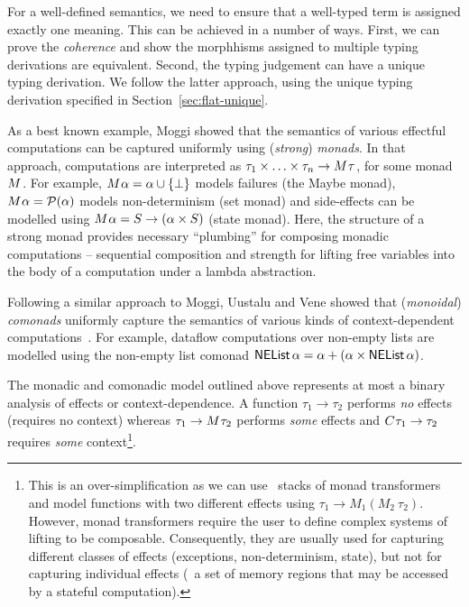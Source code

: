 For a well-defined semantics, we need to ensure that a well-typed term is assigned exactly one
meaning. This can be achieved in a number of ways. First, we can prove the \emph{coherence}
\cite{semantics-bltres} and show the morphhisms assigned to multiple typing derivations are equivalent.
Second, the typing judgement can have a unique typing derivation. We follow the latter approach,
using the unique typing derivation specified in Section~\ref{sec:flat-unique}.

As a best known example, Moggi \cite{monad-notions} showed that the semantics of various effectful
computations can be captured uniformly using (\emph{strong}) \emph{monads}. In that
approach, computations are interpreted as $\tau_1 \times \ldots \times \tau_n \rightarrow M^{}\tau$,
for some monad $M^{}$. For example, $M^{}\alpha = \alpha \cup \{ \bot \}$ models
failures (the Maybe monad), $M^{}\alpha = \mathcal{P}(\alpha)$ models non-determinism (set
monad) and side-effects can be modelled using $M^{}\alpha = S \rightarrow (\alpha \times S)$
(state monad). Here, the structure of a strong monad provides necessary ``plumbing'' for composing
monadic computations -- sequential composition and strength for lifting free variables into the
body of a computation under a lambda abstraction.

Following a similar approach to Moggi, Uustalu and Vene \cite{comonads-notions} showed that
(\emph{monoidal}) \emph{comonads} uniformly capture the semantics of various kinds of context-dependent
computations~\cite{comonads-notions}. For example, dataflow computations over non-empty lists
are modelled using the non-empty list comonad $\ident{NEList}\,\alpha = \alpha + (\alpha \times \ident{NEList}\,\alpha)$.

The monadic and comonadic model outlined above represents at most a binary analysis of effects or
context-dependence. A function $\tau_1 \rightarrow \tau_2$ performs \emph{no} effects (requires no
context) whereas $\tau_1 \rightarrow M^{}\tau_2$ performs \emph{some} effects and
$C^{}\tau_1 \rightarrow \tau_2$ requires \emph{some} context\footnote{This is an
over-simplification as we can use \eg~stacks of monad transformers and model functions with
two different effects using $\tau_1 \rightarrow M_1(M_2~\tau_2)$. However, monad transformers
require the user to define complex systems of lifting to be composable. Consequently, they are usually used
for capturing different classes of effects (exceptions, non-determinism, state), but not for
capturing individual effects (\eg~a set of memory regions that may be accessed by a
stateful computation).}.

